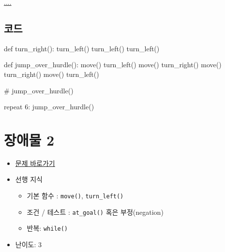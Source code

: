 \documentclass[
  b5paperpaper,
  DIV=11,
  numbers=noendperiod]{scrreprt}
\newenvironment{Shaded}{\begin{snugshade}}{\end{snugshade}}
\newcommand{\CommentTok}[1]{\textcolor[rgb]{0.37,0.37,0.37}{#1}}
\newcommand{\ControlFlowTok}[1]{\textcolor[rgb]{0.00,0.23,0.31}{#1}}
\newcommand{\DecValTok}[1]{\textcolor[rgb]{0.68,0.00,0.00}{#1}}
\newcommand{\FunctionTok}[1]{\textcolor[rgb]{0.28,0.35,0.67}{#1}}
\newcommand{\NormalTok}[1]{\textcolor[rgb]{0.00,0.23,0.31}{#1}}
\newcommand{\SpecialCharTok}[1]{\textcolor[rgb]{0.37,0.37,0.37}{#1}}
\providecommand{\tightlist}{%
  \setlength{\itemsep}{0pt}\setlength{\parskip}{0pt}}\usepackage{longtable,booktabs,array}
\begin{document}
\url{....}

\hypertarget{uxcf54uxb4dc-11}{%
\subsection{코드}\label{uxcf54uxb4dc-11}}

\begin{Shaded}
\begin{Highlighting}[]
\NormalTok{def }\FunctionTok{turn\_right}\NormalTok{()}\SpecialCharTok{:}
    \FunctionTok{turn\_left}\NormalTok{()}
    \FunctionTok{turn\_left}\NormalTok{()}
    \FunctionTok{turn\_left}\NormalTok{()}

\NormalTok{def }\FunctionTok{jump\_over\_hurdle}\NormalTok{()}\SpecialCharTok{:}    
    \FunctionTok{move}\NormalTok{()}
    \FunctionTok{turn\_left}\NormalTok{()}
    \FunctionTok{move}\NormalTok{()}
    \FunctionTok{turn\_right}\NormalTok{()}
    \FunctionTok{move}\NormalTok{()}
    \FunctionTok{turn\_right}\NormalTok{()}
    \FunctionTok{move}\NormalTok{()}
    \FunctionTok{turn\_left}\NormalTok{()}

\CommentTok{\# jump\_over\_hurdle()    }

\ControlFlowTok{repeat} \DecValTok{6}\SpecialCharTok{:}
   \FunctionTok{jump\_over\_hurdle}\NormalTok{()}
\end{Highlighting}
\end{Shaded}

\hypertarget{hurdle-02}{%
\section{장애물 2}\label{hurdle-02}}

\begin{itemize}
\tightlist
\item
  \href{https://reeborg.ca/reeborg.html?lang=ko-en\&mode=python\&menu=worlds\%2Fmenus\%2Freeborg_intro_en.json\&name=Hurdle\%202\&url=worlds\%2Ftutorial_en\%2Fhurdle2.json}{문제
  바로가기}
\item
  선행 지식

  \begin{itemize}
  \tightlist
  \item
    기본 함수 : \texttt{move()}, \texttt{turn\_left()}
  \item
    조건 / 테스트 : \texttt{at\_goal()} 혹은 부정(negation)
  \item
    반복: \texttt{while()}
  \end{itemize}
\item
  난이도: 3
\end{itemize}
\end{document}

